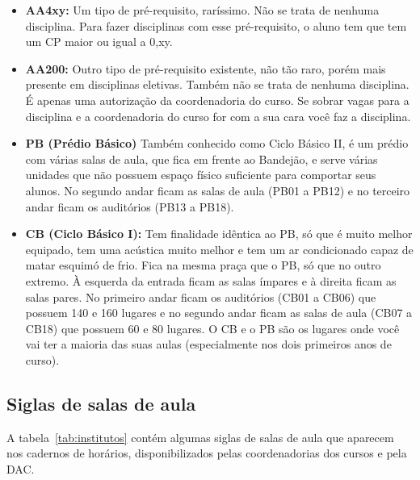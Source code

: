 \begin{itemize}
\item  \textbf{AA4xy:} Um tipo de pré-requisito, raríssimo. Não se trata de nenhuma disciplina. Para fazer disciplinas com esse pré-requisito, o aluno tem que tem um CP maior ou igual a 0,xy.
\end{itemize}

\begin{itemize}
\item  \textbf{AA200:} Outro tipo de pré-requisito existente, não tão raro, porém mais presente em disciplinas eletivas. Também não se trata de nenhuma disciplina. É apenas uma autorização da coordenadoria do curso. Se sobrar vagas para a disciplina e a coordenadoria do curso for com a sua cara você faz a disciplina.
\end{itemize}

\begin{itemize}
\item  \textbf{PB (Prédio Básico)} Também conhecido como Ciclo Básico II, é um prédio com várias salas de aula, que fica em frente ao Bandejão, e serve várias unidades que não possuem espaço físico suficiente para comportar seus alunos. No segundo andar ficam as salas de aula (PB01 a PB12) e no terceiro andar ficam os auditórios (PB13 a PB18).
\end{itemize}

\begin{itemize}
\item  \textbf{CB (Ciclo Básico I):} Tem finalidade idêntica ao PB, só que é muito melhor equipado, tem uma acústica muito melhor e tem um ar condicionado capaz de matar esquimó de frio. Fica na mesma praça que o PB, só que no outro extremo. À esquerda da entrada ficam as salas ímpares e à direita ficam as salas pares. No primeiro andar ficam os auditórios (CB01 a CB06) que possuem 140 e 160 lugares e no segundo andar ficam as salas de aula (CB07 a CB18) que possuem 60 e 80 lugares.  O CB e o PB são os lugares onde você vai ter a maioria das suas aulas (especialmente nos dois primeiros anos de curso).
\end{itemize}

\subsection{Siglas de salas de aula}

A tabela~\ref{tab:institutos} contém algumas siglas de salas de aula que aparecem nos cadernos
de horários, disponibilizados pelas coordenadorias dos cursos e pela DAC.

